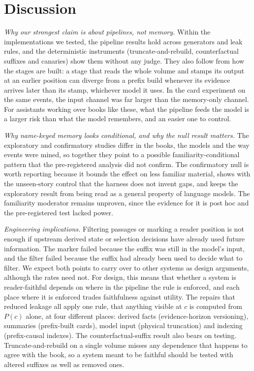 \documentclass[sn-mathphys]{sn-jnl}%
\theoremstyle{thmstyleone}%
\theoremstyle{thmstyletwo}%
\theoremstyle{thmstylethree}%
\begin{document}
\section{Discussion}\label{sec:discussion}

\emph{Why our strongest claim is about pipelines, not memory.} Within the implementations we tested, the pipeline results hold across generators and leak rules, and the deterministic instruments (truncate-and-rebuild, counterfactual suffixes and canaries) show them without any judge. They also follow from how the stages are built: a stage that reads the whole volume and stamps its output at an earlier position can diverge from a prefix build whenever its evidence arrives later than its stamp, whichever model it uses. In the card experiment on the same events, the input channel was far larger than the memory-only channel. For assistants working over books like these, what the pipeline feeds the model is a larger risk than what the model remembers, and an easier one to control.

\emph{Why name-keyed memory looks conditional, and why the null result matters.} The exploratory and confirmatory studies differ in the books, the models and the way events were mined, so together they point to a possible familiarity-conditional pattern that the pre-registered analysis did not confirm. The confirmatory null is worth reporting because it bounds the effect on less familiar material, shows with the unseen-story control that the harness does not invent gaps, and keeps the exploratory result from being read as a general property of language models. The familiarity moderator remains unproven, since the evidence for it is post hoc and the pre-registered test lacked power.

\emph{Engineering implications.} Filtering passages or marking a reader position is not enough if upstream derived state or selection decisions have already used future information. The marker failed because the suffix was still in the model's input, and the filter failed because the suffix had already been used to decide what to filter. We expect both points to carry over to other systems as design arguments, although the rates need not. For design, this means that whether a system is reader-faithful depends on where in the pipeline the rule is enforced, and each place where it is enforced trades faithfulness against utility. The repairs that reduced leakage all apply one rule, that anything visible at $c$ is computed from $P(c)$ alone, at four different places: derived facts (evidence-horizon versioning), summaries (prefix-built cards), model input (physical truncation) and indexing (prefix-causal indexes). The counterfactual-suffix result also bears on testing. Truncate-and-rebuild on a single volume misses any dependence that happens to agree with the book, so a system meant to be faithful should be tested with altered suffixes as well as removed ones.
\end{document}
